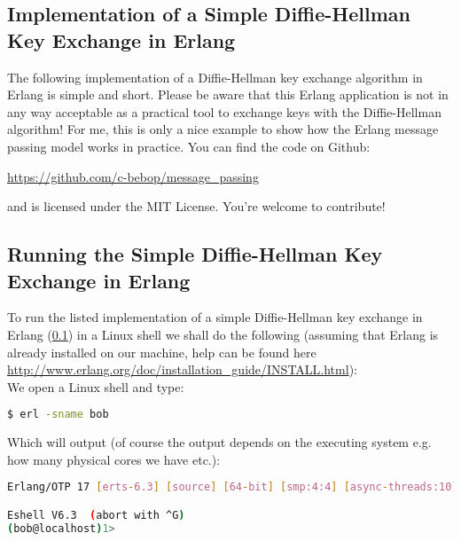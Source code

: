 \documentclass[xcolor=dvipsnames]{article}
\begin{document}
\subsection{Implementation of a Simple Diffie-Hellman Key Exchange in Erlang} \label{erlang_implementation}

The following implementation of a Diffie-Hellman key exchange algorithm in Erlang is simple and short. Please be aware that this Erlang application is not in any way acceptable as a practical tool to exchange keys with the Diffie-Hellman algorithm! For me, this is only a nice example to show how the Erlang message passing model works in practice. You can find the code on Github:

\begin{center}
\url{https://github.com/c-bebop/message_passing}
\end{center}

and is licensed under the MIT License. You're welcome to contribute!



\subsection{Running the Simple Diffie-Hellman Key Exchange in Erlang}

To run the listed implementation of a simple Diffie-Hellman key exchange in Erlang (\ref{erlang_implementation}) in a Linux shell we shall do the following (assuming that Erlang is already installed on our machine, help can be found here \url{http://www.erlang.org/doc/installation_guide/INSTALL.html}):\\

\noindent We open a Linux shell and type:

\begin{lstlisting}[language=bash, numbers=none]
$ erl -sname bob
\end{lstlisting}

\noindent Which will output (of course the output depends on the executing system e.g. how many physical cores we have etc.):

\begin{lstlisting}[language=bash, numbers=none]
Erlang/OTP 17 [erts-6.3] [source] [64-bit] [smp:4:4] [async-threads:10] [hipe] [kernel-poll:false]

Eshell V6.3  (abort with ^G)
(bob@localhost)1> 
\end{lstlisting}
\end{document}
